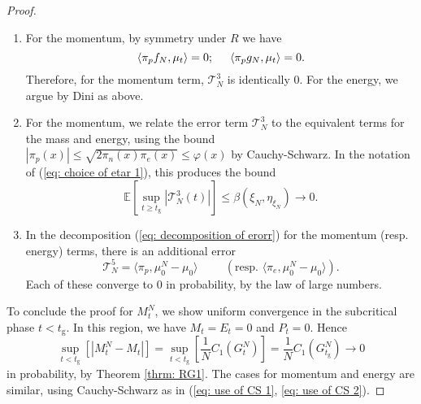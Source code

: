\begin{proof}
\begin{enumerate}[label=\roman{*}).]
       \item For the momentum, by symmetry under $R$ we have \begin{equation}
           \langle \pi_p f_N, \mu_t\rangle =0; \hspace{0.5cm} \langle \pi_p g_N, \mu_t\rangle =0.
       \end{equation} Therefore, for the momentum term, $\mathcal{T}^3_N$ is identically $0$. For the energy, we argue by Dini as above.
       \item For the momentum, we relate the error term $\mathcal{T}^3_N$ to the equivalent terms for the mass and energy, using the bound $|\pi_p(x)|\le\sqrt{2\pi_n(x)\pi_e(x)} \le \varphi(x)$ by Cauchy-Schwarz. In the notation of (\ref{eq: choice of etar 1}), this produces the bound \begin{equation}
           \mathbb{E}\left[\sup_{t\geq t_\mathrm{g}} |\mathcal{T}^3_N(t)|\right] \leq \beta(\xi_N,\eta_{\xi_N})\rightarrow 0.
       \end{equation}
       \item In the decomposition (\ref{eq: decomposition of erorr}) for the momentum (resp. energy) terms, there is an additional error \begin{equation}
           \mathcal{T}^5_N = \langle \pi_p, \mu^N_0-\mu_0\rangle \hspace{1cm}\left(\text{resp. } \langle \pi_e, \mu^N_0-\mu_0\rangle\right).
       \end{equation} Each of these converge to $0$ in probability, by the law of large numbers.
   \end{enumerate} \bigskip  To conclude the proof for $M^N_t$, we show uniform convergence in the subcritical phase $t<t_\mathrm{g}$. In this region, we have $M_t=E_t=0$ and $P_t=0$. Hence \begin{equation}
       \sup_{t<t_\mathrm{g}} \left[|M^N_t-M_t|\right] = \sup_{t<t_\mathrm{g}}\left[ \frac{1}{N}C_1(G^N_t)\right]=\frac{1}{N}C_1(G^N_{t_\mathrm{g}}) \rightarrow 0
   \end{equation} in probability, by Theorem \ref{thrm: RG1}. The cases for momentum and energy are similar, using Cauchy-Schwarz as in (\ref{eq: use of CS 1}, \ref{eq: use of CS 2}). \end{proof} 
   
